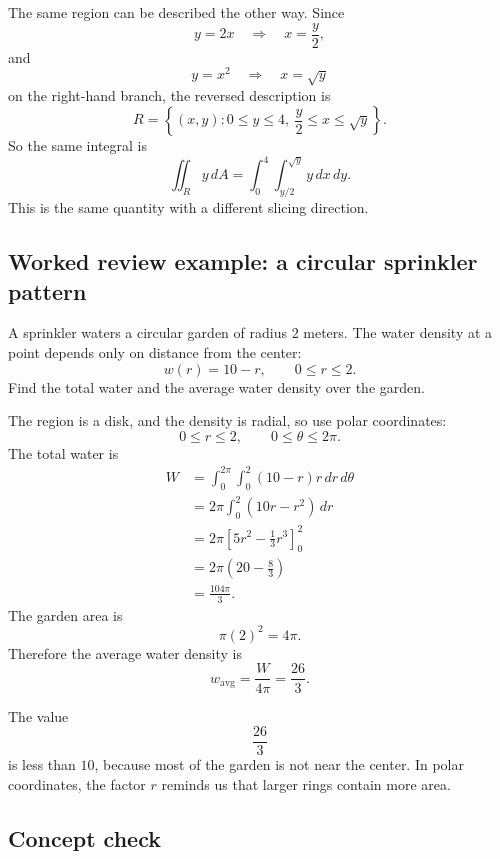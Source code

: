 The same region can be described the other way.  Since
\[
    y=2x
    \quad\Longrightarrow\quad
    x=\frac y2,
\]
and
\[
    y=x^2
    \quad\Longrightarrow\quad
    x=\sqrt y
\]
on the right-hand branch, the reversed description is
\[
    R=\left\{(x,y):0\le y\le4,\ \frac y2\le x\le \sqrt y\right\}.
\]
So the same integral is
\[
\boxed{
    \iint_R y\,dA
    =
    \int_0^4\int_{y/2}^{\sqrt y}y\,dx\,dy.
}
\]
This is the same quantity with a different slicing direction.

\subsection{Worked review example: a circular sprinkler pattern}

A sprinkler waters a circular garden of radius \(2\) meters.  The water density at a
point depends only on distance from the center:
\[
    w(r)=10-r,
    \qquad
    0\le r\le2.
\]
Find the total water and the average water density over the garden.

The region is a disk, and the density is radial, so use polar coordinates:
\[
    0\le r\le2,
    \qquad
    0\le\theta\le2\pi.
\]
The total water is
\[
\begin{aligned}
W
&=
\int_0^{2\pi}\int_0^2 (10-r)r\,dr\,d\theta\\
&=
2\pi\int_0^2(10r-r^2)\,dr\\
&=
2\pi\left[5r^2-\frac13r^3\right]_0^2\\
&=
2\pi\left(20-\frac83\right)\\
&=
\boxed{\frac{104\pi}{3}}.
\end{aligned}
\]
The garden area is
\[
    \pi(2)^2=4\pi.
\]
Therefore the average water density is
\[
\boxed{
    w_{\mathrm{avg}}
    =
    \frac{W}{4\pi}
    =
    \frac{26}{3}.
}
\]

The value
\[
    \frac{26}{3}
\]
is less than \(10\), because most of the garden is not near the center.  In polar
coordinates, the factor \(r\) reminds us that larger rings contain more area.

\subsection{Concept check}

